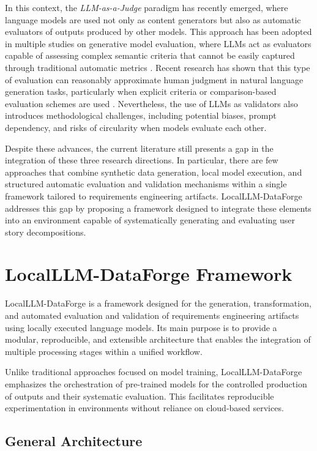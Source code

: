 \documentclass[pdflatex,sn-mathphys-num]{sn-jnl}
\theoremstyle{thmstyleone}%
\theoremstyle{thmstyletwo}%
\theoremstyle{thmstylethree}%
\begin{document}
In this context, the \textit{LLM-as-a-Judge} paradigm has recently emerged, where language models are used not only as content generators but also as automatic evaluators of outputs produced by other models. This approach has been adopted in multiple studies on generative model evaluation, where LLMs act as evaluators capable of assessing complex semantic criteria that cannot be easily captured through traditional automatic metrics \cite{daly2025}. Recent research has shown that this type of evaluation can reasonably approximate human judgment in natural language generation tasks, particularly when explicit criteria or comparison-based evaluation schemes are used \cite{eigler2026}. Nevertheless, the use of LLMs as validators also introduces methodological challenges, including potential biases, prompt dependency, and risks of circularity when models evaluate each other.

Despite these advances, the current literature still presents a gap in the integration of these three research directions. In particular, there are few approaches that combine synthetic data generation, local model execution, and structured automatic evaluation and validation mechanisms within a single framework tailored to requirements engineering artifacts. LocalLLM-DataForge addresses this gap by proposing a framework designed to integrate these elements into an environment capable of systematically generating and evaluating user story decompositions.

\section{LocalLLM-DataForge Framework}\label{sec3}

LocalLLM-DataForge is a framework designed for the generation, transformation, and automated evaluation and validation of requirements engineering artifacts using locally executed language models. Its main purpose is to provide a modular, reproducible, and extensible architecture that enables the integration of multiple processing stages within a unified workflow.

Unlike traditional approaches focused on model training, LocalLLM-DataForge emphasizes the orchestration of pre-trained models for the controlled production of outputs and their systematic evaluation. This facilitates reproducible experimentation in environments without reliance on cloud-based services.

\subsection{General Architecture}
\end{document}
